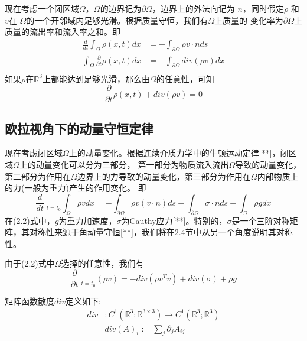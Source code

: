 现在考虑一个闭区域$\Omega$，$\Omega$的边界记为$\partial \Omega$，边界上的外法向记为
$n$，同时假定$\rho$ 和 $v$在 $\Omega$的一个开邻域内足够光滑。根据质量守恒，我们有$\Omega$上质量的
变化率为$\partial \Omega$上质量的流出率和流入率之和。即
\begin{equation}
    \begin{split}
        \frac{d}{dt}\int_{\Omega} \rho(x,t)dx &= -\int_{\partial \Omega} \rho v \cdot n ds \\
        \int_{\Omega} \frac{\partial}{\partial t} \rho (x,t)dx &= -\int_{\partial \Omega} div(\rho v)dx\nonumber\\
    \end{split}
\end{equation}
如果$\rho$在$\mathbb{R}^3$上都能达到足够光滑，那么由$\Omega$的任意性，可知
\begin{equation}
    \frac{\partial}{\partial t}\rho (x,t) + div(\rho v) = 0
\end{equation}

\subsection{欧拉视角下的动量守恒定律}
现在考虑闭区域$\Omega$上的动量变化。根据连续介质力学中的牛顿运动定律[**]，闭区域$\Omega$上的动量变化可以分为三部分，
第一部分为物质流入流出$\Omega$导致的动量变化，第二部分为作用在$\Omega$边界上的力导致的动量变化，第三部分为作用在$\Omega$内部物质上的力(一般为重力)产生的作用变化。
即
\begin{equation}
    \frac{d}{dt} \Big |_{t = t_0} \int_{\Omega} \rho v dx = -\int_{\partial \Omega} \rho v (v\cdot n) ds + \int_{\partial \Omega} \sigma \cdot n ds + \int_{\Omega} \rho g dx
\end{equation}
在(2.2)式中，$g$为重力加速度，$\sigma$为Cauthy应力[**]。特别的，$\sigma$是一个三阶对称矩阵，其对称性来源于角动量守恒[**]，我们将在2.4节中从另一个角度说明其对称性。

由于(2.2)式中$\Omega$选择的任意性，我们有
\begin{equation}
    \frac{\partial}{\partial t} \Big |_{t = t_0}(\rho v) = -div(\rho v^{T}v) + div(\sigma) + \rho g
\end{equation}

矩阵函数散度$div$定义如下:
\begin{equation}
    \begin{split}
        div &: C^1(\mathbb{R}^3;\mathbb{R}^{3\times 3}) \rightarrow C^1(\mathbb{R}^3;\mathbb{R}^3)\\
        &div(A)_i := \sum_j \partial_j A_{ij}\nonumber\\
    \end{split}
\end{equation}

